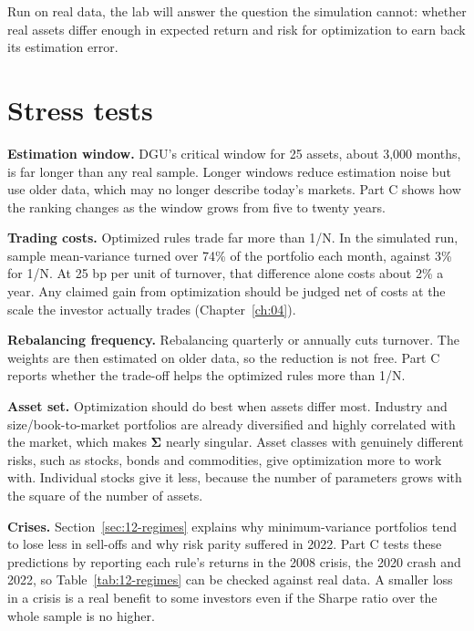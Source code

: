 Run on real data, the lab will answer the question the simulation cannot: whether real assets differ enough in expected return and risk for optimization to earn back its estimation error.

\section{Stress tests}
\label{sec:12-stress}

\textbf{Estimation window.} DGU's critical window for 25 assets, about 3,000 months, is far longer than any real sample. Longer windows reduce estimation noise but use older data, which may no longer describe today's markets. Part C shows how the ranking changes as the window grows from five to twenty years.

\textbf{Trading costs.} Optimized rules trade far more than 1/N. In the simulated run, sample mean-variance turned over 74\% of the portfolio each month, against 3\% for 1/N. At 25 bp per unit of turnover, that difference alone costs about 2\% a year. Any claimed gain from optimization should be judged net of costs at the scale the investor actually trades (Chapter~\ref{ch:04}).

\textbf{Rebalancing frequency.} Rebalancing quarterly or annually cuts turnover. The weights are then estimated on older data, so the reduction is not free. Part C reports whether the trade-off helps the optimized rules more than 1/N.

\textbf{Asset set.} Optimization should do best when assets differ most. Industry and size/book-to-market portfolios are already diversified and highly correlated with the market, which makes $\boldsymbol{\Sigma}$ nearly singular. Asset classes with genuinely different risks, such as stocks, bonds and commodities, give optimization more to work with. Individual stocks give it less, because the number of parameters grows with the square of the number of assets.

\textbf{Crises.} Section~\ref{sec:12-regimes} explains why minimum-variance portfolios tend to lose less in sell-offs and why risk parity suffered in 2022. Part C tests these predictions by reporting each rule's returns in the 2008 crisis, the 2020 crash and 2022, so Table~\ref{tab:12-regimes} can be checked against real data. A smaller loss in a crisis is a real benefit to some investors even if the Sharpe ratio over the whole sample is no higher.


